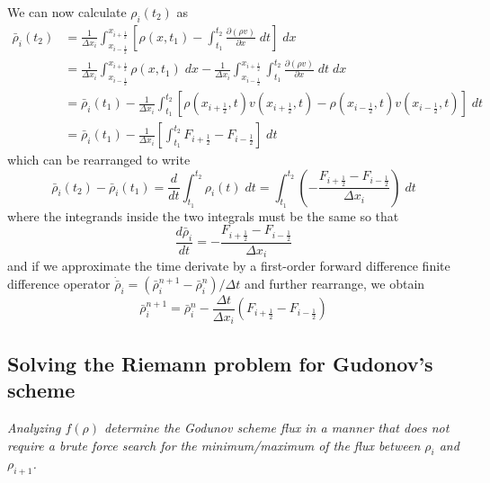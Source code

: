 \documentclass[11pt]{article}
\begin{document}
We can now calculate $\rho_i(t_2)$ as
\begin{align*}
\bar{\rho}_i(t_2) &=
	\frac{1}{\Delta x_i} \int_{x_{i-\frac{1}{2}}}^{x_{i+\frac{1}{2}}} \left[ \rho(x,t_1) - \int_{t_1}^{t_2} \frac{\partial(\rho v)}{\partial x} \; dt \right] \; dx \\
	&= \frac{1}{\Delta x_i} \int_{x_{i-\frac{1}{2}}}^{x_{i+\frac{1}{2}}} \rho(x,t_1) \; dx - \frac{1}{\Delta x_i} \int_{x_{i-\frac{1}{2}}}^{x_{i+\frac{1}{2}}} \int_{t_1}^{t_2} \frac{\partial(\rho v)}{\partial x} \; dt \; dx \\
	&= \bar{\rho}_i(t_1) - \frac{1}{\Delta x_i} \int_{t_1}^{t_2} \left[ \rho(x_{i+\frac{1}{2}}, t) v(x_{i+\frac{1}{2}}, t) - \rho(x_{i-\frac{1}{2}}, t) v(x_{i-\frac{1}{2}}, t) \right] \; dt \\
	&= \bar{\rho}_i(t_1) - \frac{1}{\Delta x_i} \left[ \int_{t_1}^{t_2} F_{i+\frac{1}{2}} - F_{i-\frac{1}{2}} \right] \; dt
\end{align*}
which can be rearranged to write
\begin{equation*}
	\bar{\rho}_i(t_2) - \bar{\rho}_i(t_1) = \frac{d}{dt} \int_{t_1}^{t_2} \rho_i(t) \; dt = \int_{t_1}^{t_2} \left( - \frac{F_{i+\frac{1}{2}} - F_{i-\frac{1}{2}}}{\Delta x_i} \right) \; dt
\end{equation*}
where the integrands inside the two integrals must be the same so that
\begin{equation*} \label{eq:drhodt}
	\frac{d \bar{\rho}_i}{dt} = - \frac{F_{i+\frac{1}{2}} - F_{i-\frac{1}{2}}}{\Delta x_i}
\end{equation*}
and if we approximate the time derivate by a first-order forward difference finite difference operator $\dot{\bar{\rho}}_i = (\bar{\rho}_i^{n+1} - \bar{\rho}_i^n)/\Delta t$ and further rearrange, we obtain
\begin{equation} \label{eq:firstorder}
	\bar{\rho}_i^{n+1} = \bar{\rho}_i^n - \frac{\Delta t}{\Delta x_i} \left( F_{i+\frac{1}{2}} - F_{i-\frac{1}{2}} \right) 
\end{equation}

\subsection{Solving the Riemann problem for Gudonov's scheme}
\begin{tcolorbox}
  \textit{Analyzing $f(\rho)$ determine the Godunov scheme flux in a manner that does not require a brute force search for the minimum/maximum of the flux between $\rho_i$ and $\rho_{i+1}$.}
\end{tcolorbox}
\end{document}

